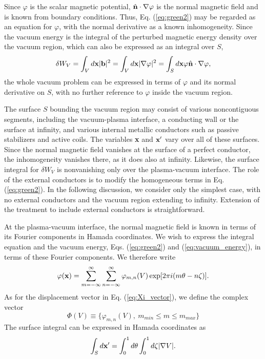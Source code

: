 \documentclass[prb,twocolumn,showpacs,preprintnumbers,amsmath,amssymb]{revtex4}
\renewcommand*{\v}[1]{\hbox{\bfseries #1}}
\begin{document}
Since $\varphi$ is the scalar magnetic potential, $\hat{\bf n} \cdot
\nabla \varphi$ is the normal magnetic field and is known from boundary
conditions.  Thus, Eq. (\ref{eq:green2}) may be regarded as an equation
for $\varphi$, with the normal derivative as a known inhomogeneity.
Since the vacuum energy is the integral of the perturbed magnetic energy
density over the vacuum region, which can also be expressed as an
integral over $S$,
\begin{equation}
\delta W_V = \int_V d\v{x} |\v{b}|^2 
= \int_V d\v{x} |\nabla \varphi|^2 
= \int_S d\v{x} \varphi \hat{\v{n}} \cdot \nabla \varphi,
\label{eq:vacuum_energy}
\end{equation}
the whole vacuum problem can be expressed in terms of $\varphi$ and its
normal derivative on $S$, with no further reference to $\varphi$ inside
the vacuum region.

The surface $S$ bounding the vacuum region may consist of various
noncontiguous segments, including the vacuum-plasma interface, a
conducting wall or the surface at infinity, and various internal
metallic conductors such as passive stabilizers and active coils.  The
variables \v{x} and $\v{x}'$ vary over all of these surfaces.  Since the
normal magnetic field vanishes at the surface of a perfect conductor,
the inhomogeneity vanishes there, as it does also at infinity.
Likewise, the surface integral for $\delta W_V$ is nonvanishing only
over the plasma-vacuum interface.  The role of the external conductors
is to modify the homogeneous terms in Eq. (\ref{eq:green2}).  In the
following discussion, we consider only the simplest case, with no
external conductors and the vacuum region extending to infinity.
Extension of the treatment to include external conductors is
straightforward.

At the plasma-vacuum interface, the normal magnetic field is known in
terms of its Fourier components in Hamada coordinates.  We wish to
express the integral equation and the vacuum energy,
Eqs. (\ref{eq:green2}) and (\ref{eq:vacuum_energy}), in terms of these
Fourier components.  We therefore write
\[
\varphi(\v{x}) = \sum_{m=-\infty}^\infty \sum_{n=-\infty}^\infty 
\varphi_{m,n}(V) \exp[2 \pi i (m \theta - n \zeta)].
\]
As for the displacement vector in Eq. (\ref{eq:Xi_vector}), we define
the complex vector
\[
\Phi(V) \equiv \{ \varphi_{m,n}(V),\ m_{min} \le m \le m_{max} \} 
\]
The surface integral can be expressed in Hamada coordinates as
\[
\int_S d\v{x}' = \int_0^1 d\theta \int_0^1 d\zeta |\nabla V|. 
\]
\end{document}
